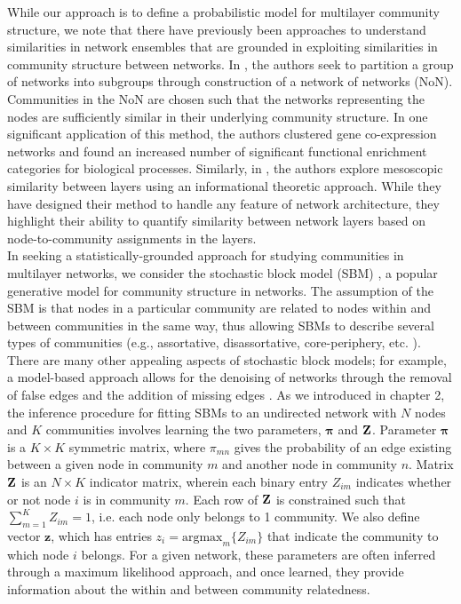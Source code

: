\indent While our approach is to define a probabilistic model for multilayer community structure, we note that there have previously been approaches to understand similarities in network ensembles that are grounded in exploiting similarities in community structure between networks. In \cite{NONCluster}, the authors seek to partition a group of networks into subgroups through construction of a network of networks (NoN). Communities in the NoN are chosen such that the networks representing the nodes are sufficiently similar in their underlying community structure. In one significant application of this method, the authors clustered gene co-expression networks and found an increased number of significant functional enrichment categories for biological processes. Similarly, in \cite{confusingMesoscopic}, the authors explore mesoscopic similarity between layers using an informational theoretic approach. While they have designed their method to handle any feature of network architecture, they highlight their ability to quantify similarity between network layers based on node-to-community assignments in the layers. \\
%
%
\indent In seeking a statistically-grounded approach for studying communities in multilayer networks, we consider the stochastic block model (SBM) \cite{originalSBM}, a popular generative model for community structure in networks. The assumption of the SBM is that nodes in a particular community are related to nodes within and between communities in the same way, thus allowing SBMs to describe several types of communities (e.g., assortative, disassortative, core-periphery, etc. \cite{rombach2014core,aicher}). 
%
There are many other appealing aspects of stochastic block models; for example, a model-based approach allows for the denoising of networks through the removal of false edges and the addition of missing edges \cite{abby,guimera2009missing}.
%
As we introduced in chapter 2, the inference procedure for fitting SBMs to an undirected network with $N$ nodes and $K$ communities involves learning the two parameters, ${\boldsymbol \pi}$ and ${\bf Z}$. Parameter ${\boldsymbol \pi}$ is a $K \times K$ symmetric matrix, where $\pi_{mn}$ gives the probability of an edge existing between a given node in community $m$ and another node in community $n$. Matrix ${\bf Z}$ is an $N \times K$ indicator matrix, wherein each binary entry $Z_{im}$ indicates whether or not node $i$ is in community $m$. Each row of ${\bf Z}$ is constrained such that $\sum_{m=1}^{K} {Z}_{im}=1$, i.e. each node only belongs to 1 community. We also define vector $\boldsymbol z$, which has entries $z_{i}=\text{argmax}_m \{Z_{im}\}$ that indicate the community to which node $i$ belongs. For a given network, these parameters are often inferred through a maximum likelihood approach, and once learned, they provide information about the within and between community relatedness. 

